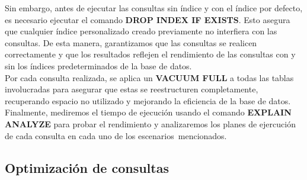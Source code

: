 Sin embargo, antes de ejecutar las consultas sin índice y con el índice por defecto, es necesario ejecutar el comando \textbf{DROP INDEX IF EXISTS}. Esto asegura que cualquier índice personalizado creado previamente no interfiera con las consultas. De esta manera, garantizamos que las consultas se realicen correctamente y que los resultados reflejen el rendimiento de las consultas con y sin los índices predeterminados de la base de datos. \\

Por cada consulta realizada, se aplica un \textbf{VACUUM FULL} a todas las tablas involucradas para asegurar que estas se reestructuren completamente, recuperando espacio no utilizado y mejorando la eficiencia de la base de datos. \\

Finalmente, mediremos el tiempo de ejecución usando el comando \textbf{EXPLAIN ANALYZE} para probar el rendimiento y analizaremos los planes de ejercución de cada consulta en cada uno de los escenarios mencionados.
\subsection{Optimización de consultas}
